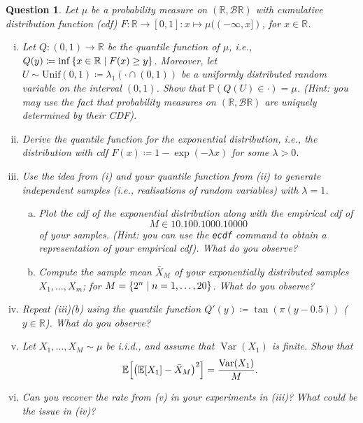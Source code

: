 \documentclass{article}
\theoremstyle{plain}
\newtheorem{question}{Question}
\theoremstyle{remark}
\newcommand{\Bb}{\mathbb}
\newcommand{\Cal}{\mathcal}
\newcommand{\Rm}{\mathrm}
\newcommand{\PP}{\Bb P}
\newcommand{\RR}{\Bb R}
\newcommand{\EE}{\Bb E}
\newcommand\ceq\coloneqq %
\DeclareMathOperator{\Var}{Var}
\newcommand\BB{\Cal B}
\begin{document}
\begin{question}
	Let $\mu$ be a probability measure on $(\RR, \BB\RR)$ with cumulative distribution function (cdf) $F \colon \RR \to [0, 1] \colon x \mapsto \mu((-\infty, x])$, for $x \in \RR$. 
	\begin{enumerate}[(i)]
		\item Let $Q \colon (0, 1) \to \RR$ be the quantile function of $\mu$, i.e., $Q(y) \ceq \inf\qty{x \in \RR \mid F(x) \geq y}$. Moreover, let $U \sim \Rm{Unif}(0, 1) \ceq \lambda_1(\cdot \cap (0, 1))$ be a uniformly distributed random variable on the interval $(0, 1)$. Show that $\PP(Q(U) \in \cdot) = \mu$. (Hint: you may use the fact that probability measures on $(\RR, \BB\RR)$ are uniquely determined by their CDF). 
		\item Derive the quantile function for the exponential distribution, i.e., the distribution with cdf $F(x) \ceq 1 - \exp(-\lambda x)$ for some $\lambda > 0$. 
		
		\item Use the idea from (i) and your quantile function from (ii) to generate independent samples (i.e., realisations of random variables) with $\lambda = 1$. 
		\begin{enumerate}[(a)]
			\item Plot the cdf of the exponential distribution along with the empirical cdf of 
			\[
			M \in \qty{10, 100, 1000, 10000}
			\]
			of your samples. (Hint: you can use the \verb|ecdf| command to obtain a representation of your empirical cdf). What do you observe?
			\item Compute the sample mean $\bar X_M$ of your exponentially distributed samples $X_1, \dotsc, X_m$; for $M = \qty{2^n \mid n = 1, \dotsc, 20}$. What do you observe? 
		\end{enumerate}
	
		\item Repeat (iii)(b) using the quantile function $Q'(y) \ceq \tan(\pi(y - 0.5))$ ($y \in \RR$). What do you observe?
		
		\item Let $X_1, \dotsc, X_M \sim \mu$ be i.i.d., and assume that $\Var(X_1)$ is finite. Show that
		\[
		\EE\qty[\qty(\EE[X_1] - \bar X_M)^2] = \frac{\Var(X_1)}{M}. 
		\]
		\item Can you recover the rate from (v) in your experiments in (iii)? What could be the issue in (iv)? 
	\end{enumerate}

\end{question}
\end{document}
